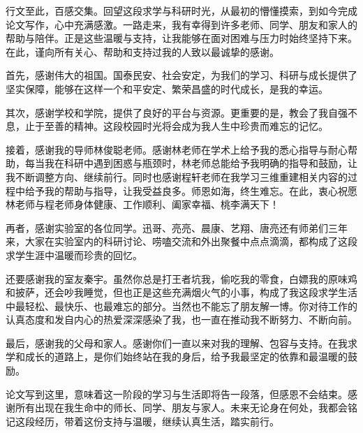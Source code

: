 

\begin{acknowledgements}

行文至此，百感交集。回望这段求学与科研时光，从最初的懵懂摸索，到如今完成论文写作，心中充满感激。一路走来，我有幸得到许多老师、同学、朋友和家人的帮助与陪伴。正是这些温暖与支持，让我能够在面对困难与压力时始终坚持下来。在此，谨向所有关心、帮助和支持过我的人致以最诚挚的感谢。

首先，感谢伟大的祖国。国泰民安、社会安定，为我们的学习、科研与成长提供了坚实保障，能够在这样一个和平安定、繁荣昌盛的时代成长，是我的幸运。

其次，感谢学校和学院，提供了良好的平台与资源。更重要的是，教会了我自强不息，止于至善的精神。这段校园时光将会成为我人生中珍贵而难忘的记忆。

接着，感谢我的导师林俊聪老师。感谢林老师在学术上给予我的悉心指导与耐心帮助，每当我在科研中遇到困惑与瓶颈时，林老师总能给予我明确的指导和鼓励，让我不断调整方向、继续前行。同时也感谢程轩老师在我学习三维重建相关内容的过程中给予我的帮助与指导，让我受益良多。师恩如海，终生难忘。在此，衷心祝愿林老师与程老师身体健康、工作顺利、阖家幸福、桃李满天下！

再者，感谢实验室的各位同学。迅哥、亮亮、晨康、艺翔、唐亮还有师弟们三年来，大家在实验室内的科研讨论、唠嗑交流和外出聚餐中点点滴滴，都构成了这段求学生涯中温暖而珍贵的回忆。

还要感谢我的室友秦宇。虽然你总是打王者坑我，偷吃我的零食，白嫖我的原味鸡和披萨，还会吵我睡觉，但也正是这些充满烟火气的小事，构成了我这段求学生活中最轻松、最快乐、也最难忘的部分。当然也不能忘了朋友解一博。你对待工作的认真态度和发自内心的热爱深深感染了我，也一直在推动我不断努力、不断向前。

最后，感谢我的父母和家人。感谢你们一直以来对我的理解、包容与支持。在我求学和成长的道路上，是你们始终站在我的身后，给予我最坚定的依靠和最温暖的鼓励。

论文写到这里，意味着这一阶段的学习与生活即将告一段落，但感恩不会结束。感谢所有出现在我生命中的师长、同学、朋友与家人。未来无论身在何处，我都会铭记这段经历，带着这份支持与温暖，继续认真生活，踏实前行。

\end{acknowledgements}
